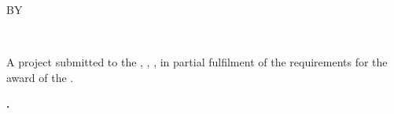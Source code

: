 \thispagestyle{empty}
\begin{center}
\textbf{\thesistitle}

\vspace{1.5cm}
BY

\vspace{1.5cm}
\textbf{\thesisauthor}\\
\studentid

\vspace{1.8cm}
A project submitted to the \departmentname, \facultyname, \institutionname, in partial fulfilment of the requirements for the award of the \degreeaward.

\vfill
\textbf{\projectyear.}
\end{center}
\clearpage
